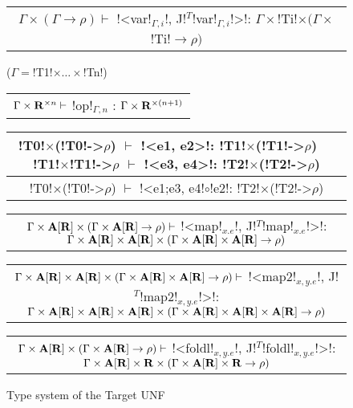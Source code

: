 \begin{figure*}[tb]
    \centering
    \begin{tabular}{c} 
    \\\hline
    $\Gamma\times(\Gamma\to \rho)  \vdash$ !<var!$_{\Gamma,i}$!, J!$^T$!var!$_{\Gamma,i}$!>!: $\Gamma\times$!Ti!$\times(\Gamma\times$!Ti!$\to \rho)$ 
    \end{tabular}($\Gamma=$!T1!$\times\ldots\times$!Tn!)
    \hspace{0.5cm}
    \begin{tabular}{c}
        \\\hline
        $\Gamma\times\mathbf{R}^{\times n} \vdash$ !op!$_{\Gamma,n}$ : $\Gamma\times\mathbf{R}^{\times(n+1)}$
    \end{tabular}

    \begin{tabular}{c}
    !T0!$\times$(!T0!->$\rho$) $\vdash$ !<e1, e2>!: !T1!$\times$(!T1!->$\rho$) $\quad$ !T1!$\times$!T1!->$\rho$ $\vdash$ !<e3, e4>!: !T2!$\times$(!T2!->$\rho$) \\\hline
    !T0!$\times$(!T0!->$\rho$) $\vdash$ !<e1;e3, e4!$\circ$!e2!: !T2!$\times$(!T2!->$\rho$)
    \end{tabular}

    \begin{tabular}{c}
        \\\hline  
        $\Gamma \times \mathbf{A}[\mathbf{R}]\times(\Gamma \times \mathbf{A}[\mathbf{R}]\to \rho) \vdash$ !<map!$_{x.e}$!, J!$^T$!map!$_{x.e}$!>!: $\Gamma \times \mathbf{A}[\mathbf{R}] \times \mathbf{A}[\mathbf{R}] \times(\Gamma \times \mathbf{A}[\mathbf{R}] \times \mathbf{A}[\mathbf{R}] \to\rho) $
    \end{tabular}

    \begin{tabular}{c}
        \\\hline  
        $\Gamma \times \mathbf{A}[\mathbf{R}] \times \mathbf{A}[\mathbf{R}]\times(\Gamma \times \mathbf{A}[\mathbf{R}] \times \mathbf{A}[\mathbf{R}]\to\rho) \vdash$ !<map2!$_{x,y.e}$!, J!$^T$!map2!$_{x,y.e}$!>!: $\Gamma \times \mathbf{A}[\mathbf{R}] \times \mathbf{A}[\mathbf{R}] \times \mathbf{A}[\mathbf{R}]\times(\Gamma \times \mathbf{A}[\mathbf{R}] \times \mathbf{A}[\mathbf{R}] \times \mathbf{A}[\mathbf{R}]\to\rho)$
    \end{tabular}

    \begin{tabular}{c}
        \\\hline  
        $\Gamma \times \mathbf{A}[\mathbf{R}]\times(\Gamma \times \mathbf{A}[\mathbf{R}]\to\rho) \vdash$ !<foldl!$_{x,y.e}$!, J!$^T$!foldl!$_{x,y.e}$!>!: $\Gamma \times \mathbf{A}[\mathbf{R}] \times \mathbf{R}\times(\Gamma \times \mathbf{A}[\mathbf{R}] \times \mathbf{R}\to\rho)$
    \end{tabular}
    \vspace{-0.2cm}
    \caption{Type system of the Target UNF}
    \vspace{-0.4cm}
    \label{fig:target_unf_typesystem}
    \end{figure*}